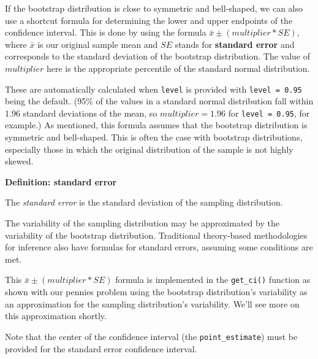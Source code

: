 \documentclass[12pt,]{krantz}
\makeatletter
\newenvironment{Shaded}{\begin{snugshade}}{\end{snugshade}}
\newcommand{\KeywordTok}[1]{\textcolor[rgb]{0.27,0.27,0.27}{\textbf{#1}}}
\newcommand{\DataTypeTok}[1]{\textcolor[rgb]{0.27,0.27,0.27}{#1}}
\newcommand{\StringTok}[1]{\textcolor[rgb]{0.5,0.5,0.5}{#1}}
\newcommand{\OperatorTok}[1]{\textcolor[rgb]{0.43,0.43,0.43}{\textbf{#1}}}
\newcommand{\NormalTok}[1]{#1}
\newenvironment{kframe}{%
\medskip{}
\setlength{\fboxsep}{.8em}
 \def\at@end@of@kframe{}%
 \ifinner\ifhmode%
  \def\at@end@of@kframe{\end{minipage}}%
  \begin{minipage}{\columnwidth}%
 \fi\fi%
 \def\FrameCommand##1{\hskip\@totalleftmargin \hskip-\fboxsep
 \colorbox{shadecolor}{##1}\hskip-\fboxsep
     \hskip-\linewidth \hskip-\@totalleftmargin \hskip\columnwidth}%
 \MakeFramed {\advance\hsize-\width
   \@totalleftmargin\z@ \linewidth\hsize
   \@setminipage}}%
 {\par\unskip\endMakeFramed%
 \at@end@of@kframe}
\renewenvironment{Shaded}{\begin{kframe}}{\end{kframe}}
\makeatother
\begin{document}
If the bootstrap distribution is close to symmetric and bell-shaped, we
can also use a shortcut formula for determining the lower and upper
endpoints of the confidence interval. This is done by using the formula
\(\bar{x} \pm (multiplier * SE),\) where \(\bar{x}\) is our original
sample mean and \(SE\) stands for \textbf{standard error} and
corresponds to the standard deviation of the bootstrap distribution. The
value of \(multiplier\) here is the appropriate percentile of the
standard normal distribution.

These are automatically calculated when \texttt{level} is provided with
\texttt{level\ =\ 0.95} being the default. (95\% of the values in a
standard normal distribution fall within 1.96 standard deviations of the
mean, so \(multiplier = 1.96\) for \texttt{level\ =\ 0.95}, for
example.) As mentioned, this formula assumes that the bootstrap
distribution is symmetric and bell-shaped. This is often the case with
bootstrap distributions, especially those in which the original
distribution of the sample is not highly skewed.

\textbf{Definition: standard error}

The \emph{standard error} is the standard deviation of the sampling
distribution.

The variability of the sampling distribution may be approximated by the
variability of the bootstrap distribution. Traditional theory-based
methodologies for inference also have formulas for standard errors,
assuming some conditions are met.

This \(\bar{x} \pm (multiplier * SE)\) formula is implemented in the
\texttt{get\_ci()} function as shown with our pennies problem using the
bootstrap distribution's variability as an approximation for the
sampling distribution's variability. We'll see more on this
approximation shortly.

Note that the center of the confidence interval (the
\texttt{point\_estimate}) must be provided for the standard error
confidence interval.

\begin{Shaded}
\end{Shaded}
\end{document}
